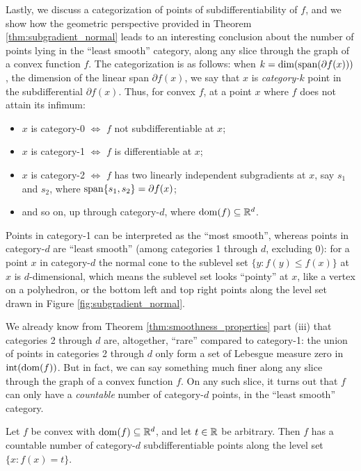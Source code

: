 Lastly, we discuss a categorization of points of subdifferentiability of $f$,
and we show how the geometric perspective provided in Theorem
\ref{thm:subgradient_normal} leads to an interesting conclusion about the number 
of points lying in the ``least smooth'' category, along any slice through the
graph of a convex function $f$. The categorization is as follows: when $k =
\operatorname{dim}(\operatorname{span}(\partial f(x)))$, the dimension of the linear span $\partial f(x)$, we
say that $x$ is \emph{category-$k$} point in the subdifferential $\partial
f(x)$. Thus, for convex $f$, at a point $x$ where $f$ does not attain its 
infimum: 
\begin{itemize}
\item $x$ is category-0 $\iff$ $f$ not subdifferentiable at $x$;
\item $x$ is category-1 $\iff$ $f$ is differentiable at $x$;
\item $x$ is category-2 $\iff$ $f$ has two linearly independent subgradients at 
  $x$, say $s_1$ and $s_2$, where $\operatorname{span}\{s_1, s_2\} = \partial f(x)$; 
\item and so on, up through category-$d$, where $\operatorname{dom}(f) \subseteq \mathbb{R}^d$. 
\end{itemize}
Points in category-1 can be interpreted as the ``most smooth'', whereas points
in category-$d$ are ``least smooth'' (among categories 1 through $d$, excluding 
0): for a point $x$ in category-$d$ the normal cone to the sublevel set $\{y :
f(y) \leq f(x)\}$ at $x$ is $d$-dimensional, which means the sublevel set looks
``pointy'' at $x$, like a vertex on a polyhedron, or the bottom left and top
right points along the level set drawn in Figure \ref{fig:subgradient_normal}.   

We already know from Theorem \ref{thm:smoothness_properties} part (iii) that
categories 2 through $d$ are, altogether, ``rare'' compared to category-1: the
union of points in categories 2 through $d$ only form a set of Lebesgue measure
zero in $\operatorname{int}(\operatorname{dom}(f))$. But in fact, we can say something much finer along
any slice through the graph of a convex function $f$. On any such slice, it
turns out that $f$ can only have a \emph{countable} number of category-$d$
points, in the ``least smooth'' category.

\begin{Theorem}
\label{thm:subgradient_category_d}
Let $f$ be convex with $\operatorname{dom}(f) \subseteq \mathbb{R}^d$, and let $t \in \mathbb{R}$ be
arbitrary.  Then $f$ has a countable number of category-$d$ subdifferentiable
points along the level set $\{x : f(x) = t\}$. 
\end{Theorem}

